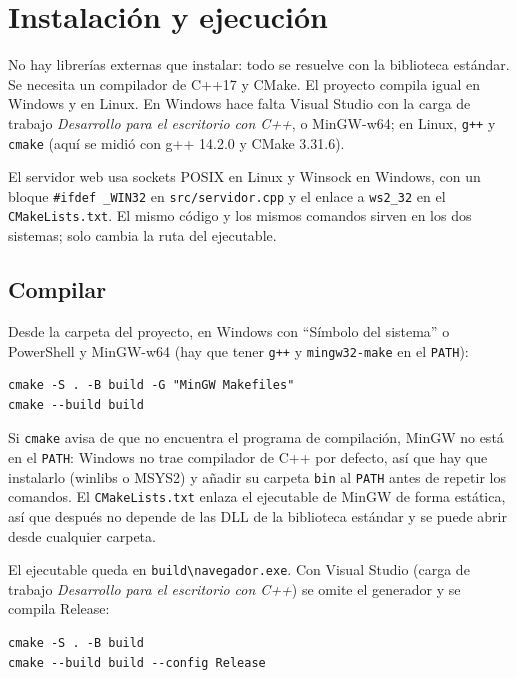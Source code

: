 \documentclass[11pt,a4paper]{article}
\newcommand{\arch}[1]{\texttt{#1}}
\begin{document}
\section{Instalación y ejecución}
\label{sec:ejecucion}

No hay librerías externas que instalar: todo se resuelve con la biblioteca
estándar. Se necesita un compilador de C++17 y CMake. El proyecto compila igual
en Windows y en Linux. En Windows hace falta Visual Studio con la carga de
trabajo \emph{Desarrollo para el escritorio con C++}, o MinGW-w64; en Linux,
\arch{g++} y \arch{cmake} (aquí se midió con g++ 14.2.0 y CMake 3.31.6).

El servidor web usa sockets POSIX en Linux y Winsock en Windows, con un bloque
\arch{\#ifdef \_WIN32} en \arch{src/servidor.cpp} y el enlace a \arch{ws2\_32} en
el \arch{CMakeLists.txt}. El mismo código y los mismos comandos sirven en los dos
sistemas; solo cambia la ruta del ejecutable.

\subsection*{Compilar}
Desde la carpeta del proyecto, en Windows con ``Símbolo del sistema'' o
PowerShell y MinGW-w64 (hay que tener \arch{g++} y \arch{mingw32-make} en el
\arch{PATH}):

\begin{lstlisting}[style=term]
cmake -S . -B build -G "MinGW Makefiles"
cmake --build build
\end{lstlisting}

Si \arch{cmake} avisa de que no encuentra el programa de compilación, MinGW no
está en el \arch{PATH}: Windows no trae compilador de C++ por defecto, así que
hay que instalarlo (winlibs o MSYS2) y añadir su carpeta \arch{bin} al
\arch{PATH} antes de repetir los comandos. El \arch{CMakeLists.txt} enlaza el
ejecutable de MinGW de forma estática, así que después no depende de las DLL de
la biblioteca estándar y se puede abrir desde cualquier carpeta.

El ejecutable queda en \arch{build\textbackslash{}navegador.exe}. Con Visual
Studio (carga de trabajo \emph{Desarrollo para el escritorio con C++}) se omite
el generador y se compila Release:

\begin{lstlisting}[style=term]
cmake -S . -B build
cmake --build build --config Release
\end{lstlisting}
\end{document}
